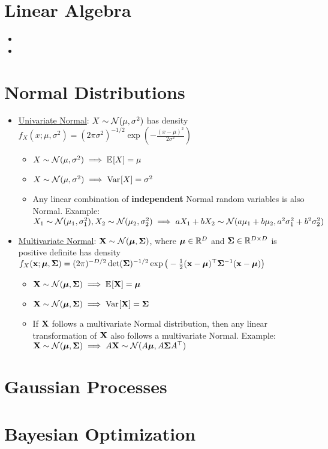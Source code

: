 \documentclass[11pt]{article}
\begin{document}
 
\section{Linear Algebra}
\begin{itemize}[label = $\blacktriangleright$, itemsep = -3pt, topsep = -10pt, leftmargin = *]
  \item 
  \item 
\end{itemize}

\section{Normal Distributions}
\begin{itemize}[label = $\blacktriangleright$, itemsep = -3pt, topsep = -10pt, leftmargin = *]
  \item 
  \underline{Univariate Normal}: $X \sim \mathcal{N}(\mu, \sigma^2)$ has density $f_{X}(x; \mu, \sigma^2) = (2\pi\sigma^{2})^{-1/2}\exp(-\frac{(x-\mu)^2}{2\sigma^2})$
  \begin{itemize}[label = $\triangleright$, itemsep = -2pt, topsep = -10pt]
    \item $X \sim \mathcal{N}(\mu, \sigma^2) \implies \mathbb{E}_{}[X] = \mu$ 
    \item $X \sim \mathcal{N}(\mu, \sigma^2) \implies \text{Var}_{}[X] = \sigma^2$ 
    \item
    Any linear combination of \textbf{independent} Normal random variables is also Normal. Example:\\ $X_{1} \sim \mathcal{N}(\mu_{1}, \sigma^{2}_{1}), X_{2} \sim \mathcal{N}(\mu_{2}, \sigma^{2}_{2}) \implies aX_{1} + bX_{2} \sim \mathcal{N}(a\mu_{1} + b\mu_{2}, a^{2}\sigma_{1}^{2} + b^2\sigma_{2}^{2})$
  \end{itemize}
  \item 
  \underline{Multivariate Normal}: $\mathbf{X} \sim \mathcal{N}(\boldsymbol{\mu}, \mathbf{\Sigma})$, where $\boldsymbol{\mu} \in \mathbb{R}^{D}$ and $\mathbf{\Sigma} \in \mathbb{R}^{D \times D}$ is positive definite has density $f_{X}(\mathbf{x}; \boldsymbol{\mu}, \mathbf{\Sigma}) = (2\pi)^{-D/2}\det(\mathbf{\Sigma})^{-1/2}\exp\big(-\frac{1}{2}(\mathbf{x} - \boldsymbol{\mu})^{\top}\mathbf{\Sigma}^{-1}(\mathbf{x} - \boldsymbol{\mu})\big)$
  \begin{itemize}[label = $\triangleright$, itemsep = -2pt, topsep = -10pt]
    \item $\mathbf{X} \sim \mathcal{N}(\boldsymbol{\mu}, \mathbf{\Sigma}) \implies \mathbb{E}_{}[\mathbf{X}] = \boldsymbol{\mu}$ 
    \item $\mathbf{X} \sim \mathcal{N}(\boldsymbol{\mu}, \mathbf{\Sigma}) \implies \text{Var}_{}[\mathbf{X}] = \mathbf{\Sigma}$ 
    \item
    If $\mathbf{X}$ follows a multivariate Normal distribution, then any linear transformation of $\mathbf{X}$ also follows a multivariate Normal. Example: $\mathbf{X} \sim \mathcal{N}(\boldsymbol{\mu}, \mathbf{\Sigma}) \implies A\mathbf{X} \sim \mathcal{N}(A\boldsymbol{\mu}, A\mathbf{\Sigma}{A^{\top}})$
  \end{itemize}
\end{itemize}

\section{Gaussian Processes}

\section{Bayesian Optimization}

\end{document}
